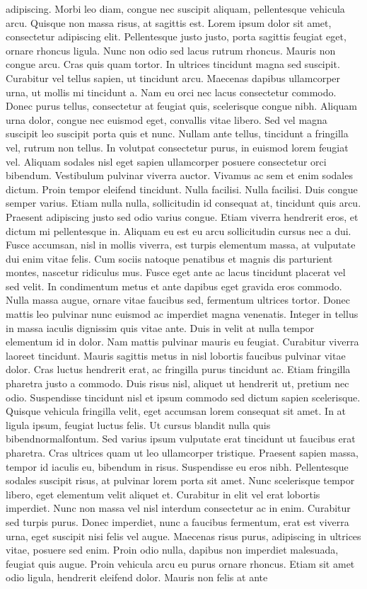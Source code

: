\documentclass[letterpaper, twoside, 12pt, memoire, creativecommons, hyperref]{thETS}
\begin{document}
\begin{introduction}
adipiscing. Morbi leo diam, congue nec suscipit aliquam, pellentesque vehicula arcu. Quisque non massa risus, at sagittis est. Lorem ipsum dolor sit amet, consectetur adipiscing elit. Pellentesque justo justo, porta sagittis feugiat eget, ornare rhoncus ligula. Nunc non odio sed lacus rutrum rhoncus. Mauris non congue arcu. Cras quis quam tortor. In ultrices tincidunt magna sed suscipit. Curabitur vel tellus sapien, ut tincidunt arcu. Maecenas dapibus ullamcorper urna, ut mollis mi tincidunt a. Nam eu orci nec lacus consectetur commodo. Donec purus tellus, consectetur at feugiat quis, scelerisque congue nibh. Aliquam urna dolor, congue nec euismod eget, convallis vitae libero. Sed vel magna suscipit leo suscipit porta quis et nunc. Nullam ante tellus, tincidunt a fringilla vel, rutrum non tellus. In volutpat consectetur purus, in euismod lorem feugiat vel. Aliquam sodales nisl eget sapien ullamcorper posuere consectetur orci bibendum. Vestibulum pulvinar viverra auctor. Vivamus ac sem et enim sodales dictum. Proin tempor eleifend tincidunt. Nulla facilisi. Nulla facilisi. Duis congue semper varius. Etiam nulla nulla, sollicitudin id consequat at, tincidunt quis arcu. Praesent adipiscing justo sed odio varius congue. Etiam viverra hendrerit eros, et dictum mi pellentesque in. Aliquam eu est eu arcu sollicitudin cursus nec a dui. Fusce accumsan, nisl in mollis viverra, est turpis elementum massa, at vulputate dui enim vitae felis. Cum sociis natoque penatibus et magnis dis parturient montes, nascetur ridiculus mus. Fusce eget ante ac lacus tincidunt placerat vel sed velit. In condimentum metus et ante dapibus eget gravida eros commodo. Nulla massa augue, ornare vitae faucibus sed, fermentum ultrices tortor. Donec mattis leo pulvinar nunc euismod ac imperdiet magna venenatis. Integer in tellus in massa iaculis dignissim quis vitae ante. Duis in velit at nulla tempor elementum id in dolor. Nam mattis pulvinar mauris eu feugiat. Curabitur viverra laoreet tincidunt. Mauris sagittis metus in nisl lobortis faucibus pulvinar vitae dolor. Cras luctus hendrerit erat, ac fringilla purus tincidunt ac. Etiam fringilla pharetra justo a commodo. Duis risus nisl, aliquet ut hendrerit ut, pretium nec odio. Suspendisse tincidunt nisl et ipsum commodo sed dictum sapien scelerisque. Quisque vehicula fringilla velit, eget accumsan lorem consequat sit amet. In at ligula ipsum, feugiat luctus felis. Ut cursus blandit nulla quis bibendnormalfontum. Sed varius ipsum vulputate erat tincidunt ut faucibus erat pharetra. Cras ultrices quam ut leo ullamcorper tristique. Praesent sapien massa, tempor id iaculis eu, bibendum in risus. Suspendisse eu eros nibh. Pellentesque sodales suscipit risus, at pulvinar lorem porta sit amet. Nunc scelerisque tempor libero, eget elementum velit aliquet et. Curabitur in elit vel erat lobortis imperdiet. Nunc non massa vel nisl interdum consectetur ac in enim. Curabitur sed turpis purus. Donec imperdiet, nunc a faucibus fermentum, erat est viverra urna, eget suscipit nisi felis vel augue. Maecenas risus purus, adipiscing in ultrices vitae, posuere sed enim. Proin odio nulla, dapibus non imperdiet malesuada, feugiat quis augue. Proin vehicula arcu eu purus ornare rhoncus. Etiam sit amet odio ligula, hendrerit eleifend dolor. Mauris non felis at ante 
\end{introduction}
\end{document}
